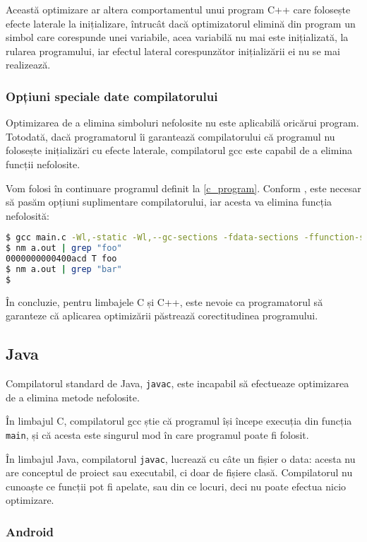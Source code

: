 Această optimizare ar altera comportamentul unui program C++ care
folosește efecte laterale la inițializare, întrucât dacă
optimizatorul elimină din program un simbol care corespunde unei
variabile, acea variabilă nu mai este inițializată, la rularea
programului, iar efectul lateral corespunzător inițializării ei
nu se mai realizează.

\subsubsection{Opțiuni speciale date compilatorului}

Optimizarea de a elimina simboluri nefolosite nu este aplicabilă
oricărui program. Totodată, dacă programatorul îi garantează
compilatorului că programul nu folosește inițializări cu efecte
laterale, compilatorul gcc este capabil de a elimina funcții
nefolosite.

Vom folosi în continuare programul definit la \ref{c_program}.
Conform \cite{c_enable_optimization}, este necesar să pasăm
opțiuni suplimentare compilatorului, iar acesta va elimina
funcția nefolosită:

\begin{lstlisting}[language=Bash]
$ gcc main.c -Wl,-static -Wl,--gc-sections -fdata-sections -ffunction-sections -Os
$ nm a.out | grep "foo"
0000000000400acd T foo
$ nm a.out | grep "bar"
$
\end{lstlisting}

În concluzie, pentru limbajele C și C++, este nevoie ca
programatorul să garanteze că aplicarea optimizării păstrează
corectitudinea programului.

\subsection{Java}

Compilatorul standard de Java, \texttt{javac}, este incapabil să
efectueaze optimizarea de a elimina metode nefolosite.

În limbajul C, compilatorul gcc știe că programul își începe
execuția din funcția \texttt{main}, și că acesta este singurul
mod în care programul poate fi folosit.

În limbajul Java, compilatorul \texttt{javac}, lucrează cu câte
un fișier o data: acesta nu are conceptul de proiect sau
executabil, ci doar de fișiere clasă.
Compilatorul nu cunoaște ce funcții pot fi apelate, sau
din ce locuri, deci nu poate efectua nicio optimizare.

\subsubsection{Android}

